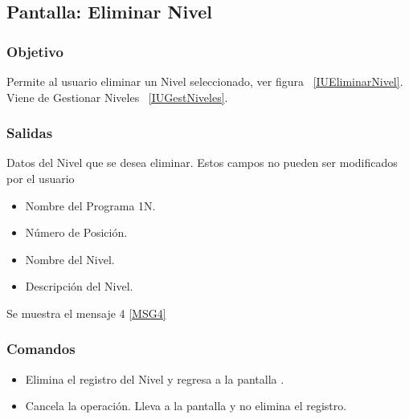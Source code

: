 \subsection{Pantalla: Eliminar Nivel}

\subsubsection{Objetivo}
Permite al usuario eliminar un Nivel seleccionado, ver figura ~\ref{IUEliminarNivel}. Viene de Gestionar Niveles ~\ref{IUGestNiveles}.


\subsubsection{Salidas}
  Datos del Nivel que se desea eliminar. Estos campos no pueden ser modificados por el usuario
\begin{itemize}
 \item Nombre del Programa 1N.
 \item Número de Posición.
 \item Nombre del Nivel.
 \item Descripción del Nivel.
\end{itemize}
Se muestra el mensaje 4 \ref{MSG4}

\subsubsection{Comandos}
\begin{itemize}
 \item {} Elimina el registro del Nivel y regresa a la pantalla .
 \item {} Cancela la operación. Lleva a la pantalla  y no elimina el registro.
\end{itemize}

